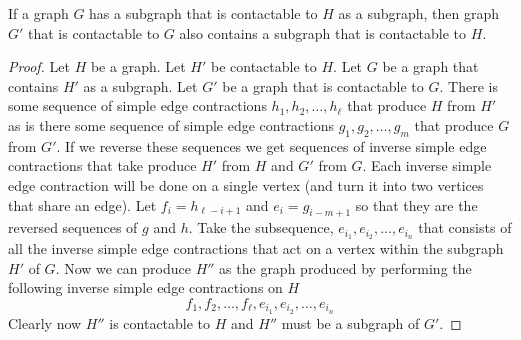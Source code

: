 \documentclass{article}
\begin{document}
\begin{lemma} \label{contractibleCarryOn}
	If a graph $G$ has a subgraph that is contactable to $H$ as a subgraph, then graph $G'$ that is contactable to $G$ also contains a subgraph that is contactable to $H$.
\end{lemma}

\begin{proof}
		Let $H$ be a graph. Let $H'$ be contactable to $H$. Let $G$ be a graph that contains $H'$ as a subgraph. Let $G'$ be a graph that is contactable to $G$. There is some sequence of simple edge contractions $h_1,h_2,\ldots,h_\ell$ that produce $H$ from $H'$ as is there some sequence of simple edge contractions $g_1,g_2,\ldots,g_m$ that produce $G$ from $G'$.
		If we reverse these sequences we get sequences of inverse simple edge contractions that take produce $H'$ from $H$ and $G'$ from $G$. Each inverse simple edge contraction will be done on a single vertex (and turn it into two vertices that share an edge). Let $f_i = h_{\ell-i+1}$ and $e_i = g_{i-m+1}$ so that they are the reversed sequences of $g$ and $h$. Take the subsequence, $e_{i_1},e_{i_2},\ldots,e_{i_n}$ that consists of all the inverse simple edge contractions that act on a vertex within the subgraph $H'$ of $G$. Now we can produce $H''$ as the graph produced by performing the following inverse simple edge contractions on $H$
		$$ f_1,f_2,\ldots,f_\ell,e_{i_1},e_{i_2},\ldots,e_{i_n} $$
		Clearly now $H''$ is contactable to $H$ and $H''$ must be a subgraph of $G'$.
\end{proof}
\end{document}
